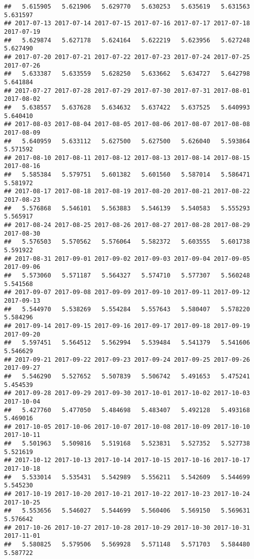 \documentclass[
]{article}
\begin{document}
\begin{verbatim}
##   5.615905   5.621906   5.629770   5.630253   5.635619   5.631563   5.631597 
## 2017-07-13 2017-07-14 2017-07-15 2017-07-16 2017-07-17 2017-07-18 2017-07-19 
##   5.629874   5.627178   5.624164   5.622219   5.623956   5.627248   5.627490 
## 2017-07-20 2017-07-21 2017-07-22 2017-07-23 2017-07-24 2017-07-25 2017-07-26 
##   5.633387   5.633559   5.628250   5.633662   5.634727   5.642798   5.641884 
## 2017-07-27 2017-07-28 2017-07-29 2017-07-30 2017-07-31 2017-08-01 2017-08-02 
##   5.638557   5.637628   5.634632   5.637422   5.637525   5.640993   5.640410 
## 2017-08-03 2017-08-04 2017-08-05 2017-08-06 2017-08-07 2017-08-08 2017-08-09 
##   5.640959   5.633112   5.627500   5.627500   5.626040   5.593864   5.571592 
## 2017-08-10 2017-08-11 2017-08-12 2017-08-13 2017-08-14 2017-08-15 2017-08-16 
##   5.585384   5.579751   5.601382   5.601560   5.587014   5.586471   5.581972 
## 2017-08-17 2017-08-18 2017-08-19 2017-08-20 2017-08-21 2017-08-22 2017-08-23 
##   5.576868   5.546101   5.563883   5.546139   5.540583   5.555293   5.565917 
## 2017-08-24 2017-08-25 2017-08-26 2017-08-27 2017-08-28 2017-08-29 2017-08-30 
##   5.576503   5.570562   5.576064   5.582372   5.603555   5.601738   5.591922 
## 2017-08-31 2017-09-01 2017-09-02 2017-09-03 2017-09-04 2017-09-05 2017-09-06 
##   5.573060   5.571187   5.564327   5.574710   5.577307   5.560248   5.541568 
## 2017-09-07 2017-09-08 2017-09-09 2017-09-10 2017-09-11 2017-09-12 2017-09-13 
##   5.544970   5.538269   5.554284   5.557643   5.580407   5.578220   5.584296 
## 2017-09-14 2017-09-15 2017-09-16 2017-09-17 2017-09-18 2017-09-19 2017-09-20 
##   5.597451   5.564512   5.562994   5.539484   5.541379   5.541606   5.546629 
## 2017-09-21 2017-09-22 2017-09-23 2017-09-24 2017-09-25 2017-09-26 2017-09-27 
##   5.546290   5.527652   5.507839   5.506742   5.491653   5.475241   5.454539 
## 2017-09-28 2017-09-29 2017-09-30 2017-10-01 2017-10-02 2017-10-03 2017-10-04 
##   5.427760   5.477050   5.484698   5.483407   5.492128   5.493168   5.469016 
## 2017-10-05 2017-10-06 2017-10-07 2017-10-08 2017-10-09 2017-10-10 2017-10-11 
##   5.501963   5.509816   5.519168   5.523831   5.527352   5.527738   5.521619 
## 2017-10-12 2017-10-13 2017-10-14 2017-10-15 2017-10-16 2017-10-17 2017-10-18 
##   5.533014   5.535431   5.542989   5.556211   5.542609   5.544699   5.545230 
## 2017-10-19 2017-10-20 2017-10-21 2017-10-22 2017-10-23 2017-10-24 2017-10-25 
##   5.553656   5.546027   5.544699   5.560406   5.569150   5.569631   5.576642 
## 2017-10-26 2017-10-27 2017-10-28 2017-10-29 2017-10-30 2017-10-31 2017-11-01 
##   5.580825   5.579506   5.569928   5.571148   5.571703   5.584480   5.587722 

\end{verbatim}
\end{document}
